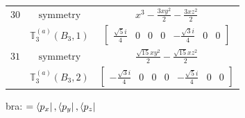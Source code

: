 \documentclass[fleqn,8pt,landscape]{jsarticle}
\begin{document}
\begin{longtable}{ccc}
$ 30 $ & $ \text{symmetry} $ & $ x^{3} - \frac{3 x y^{2}}{2} - \frac{3 x z^{2}}{2} $ \\
$  $ & $ \mathbb{T}_{3}^{(a)}(B_{3},1) $ & $ \begin{bmatrix} \frac{\sqrt{5} i}{4} & 0 & 0 & 0 & - \frac{\sqrt{3} i}{4} & 0 & 0 \end{bmatrix} $ \\ \hline
$ 31 $ & $ \text{symmetry} $ & $ \frac{\sqrt{15} x y^{2}}{2} - \frac{\sqrt{15} x z^{2}}{2} $ \\
$  $ & $ \mathbb{T}_{3}^{(a)}(B_{3},2) $ & $ \begin{bmatrix} - \frac{\sqrt{3} i}{4} & 0 & 0 & 0 & - \frac{\sqrt{5} i}{4} & 0 & 0 \end{bmatrix} $ \\ \hline
\end{longtable}
bra: $=\bra{p_{x}}, \bra{p_{y}}, \bra{p_{z}}$
\end{document}
